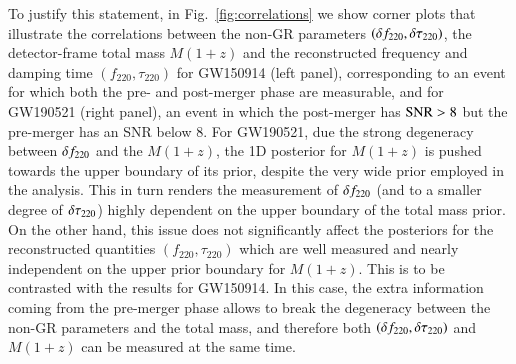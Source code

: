 To justify this statement, in Fig.~\ref{fig:correlations} we show corner plots that illustrate the correlations between the non-GR parameters $(\delta f_{\text{220}}, \delta \tau_{\text{220}})$, the detector-frame total mass $M(1+z)$ and the reconstructed frequency and damping time $(f_{220},\tau _{220})$ for GW150914 (left panel), corresponding to an event for which both the pre- and post-merger phase are measurable, and for GW190521 (right panel), an event in which the post-merger has ${\rm SNR}> 8$ but the pre-merger has an SNR below 8. For GW190521, due the strong degeneracy between $\delta f_{\text{220}}$ and the $M(1+z)$, the 1D posterior for $M(1+z)$ is pushed towards the upper boundary of its prior, despite the very wide prior employed in the analysis. This in turn renders the measurement of $\delta f_{\text{220}}$ (and to a smaller degree of $\delta \tau_{\text{220}}$) highly dependent on the upper boundary of the total mass prior. On the other hand, this issue does not significantly affect the posteriors for the reconstructed quantities $(f_{220},\tau _{220})$ which are well measured and nearly independent on the upper prior boundary for $M(1+z)$. 
%
This is to be contrasted with the results for GW150914. In this case, the extra information coming from the pre-merger phase allows to break the degeneracy between the non-GR parameters and the total mass, and therefore both $(\delta f_{\text{220}}, \delta \tau_{\text{220}})$ and $M(1+z)$ can be measured at the same time. 

